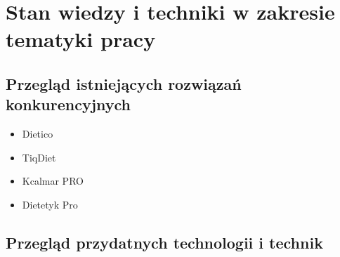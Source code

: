 \chapter{Stan wiedzy i techniki w zakresie tematyki pracy}
\section{Przegląd istniejących rozwiązań konkurencyjnych}
\begin{itemize}
    \item Dietico
    \item TiqDiet
    \item Kcalmar PRO
    \item Dietetyk Pro
\end{itemize}

\section{Przegląd przydatnych technologii i technik}

\thispagestyle{normal}
